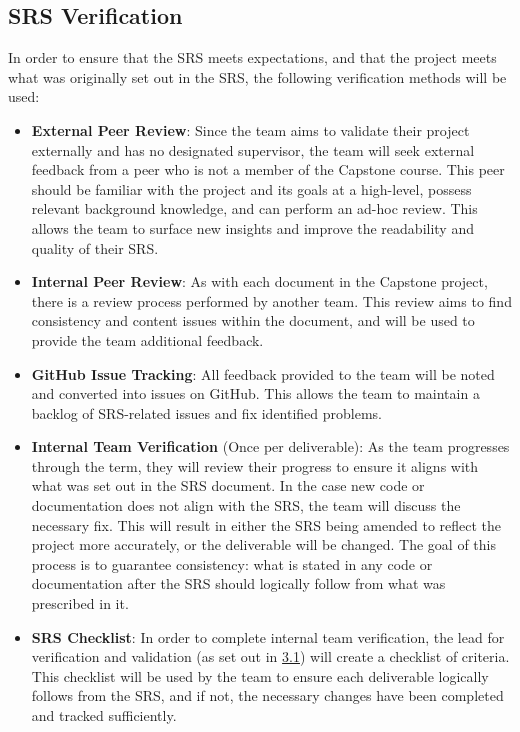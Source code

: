 \documentclass[12pt, titlepage]{article}
\begin{document}
\subsection{SRS Verification}
\label{sec:SRSVer}

In order to ensure that the SRS meets expectations, and that the project meets what was originally set out in the SRS,
the following verification methods will be used:

\begin{itemize}
  \item \textbf{External Peer Review}: Since the team aims to validate their project externally and \progname{} has no designated supervisor, the team will seek
  external feedback from a peer who is not a member of the Capstone course. This peer should be familiar with the project and its goals at a high-level, 
  possess relevant background knowledge, and can perform an ad-hoc review. This allows the team to surface new insights and improve the readability and quality of their SRS.
  \item \textbf{Internal Peer Review}: As with each document in the Capstone project, there is a review process performed by another team.
  This review aims to find consistency and content issues within the document, and will be used to provide the team additional feedback.
  \item \textbf{GitHub Issue Tracking}: All feedback provided to the team will be noted and converted into issues on GitHub. This allows the team to maintain a backlog
  of SRS-related issues and fix identified problems.
  \item \textbf{Internal Team Verification} (Once per deliverable): As the team progresses through the term, they will review their
  progress to ensure it aligns with what was set out in the SRS document. In the case new code or documentation does not align
  with the SRS, the team will discuss the necessary fix. This will result in either the SRS being amended to reflect the project more accurately,
  or the deliverable will be changed. The goal of this process is to guarantee consistency: what is stated in any code or documentation after the SRS
  should logically follow from what was prescribed in it.
  \item \textbf{SRS Checklist}: In order to complete internal team verification, the lead for verification and validation (as set out in \hyperref[sec:VnVTeam]{3.1}) will
  create a checklist of criteria. This checklist will be used by the team to ensure each deliverable logically follows from the SRS, and if not, the necessary changes have 
  been completed and tracked sufficiently.

\end{itemize}
\end{document}
